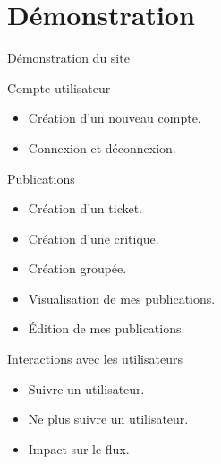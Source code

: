 \section{Démonstration}

\begin{frame}{Démonstration du site}
  \begin{block}{Compte utilisateur}
    \tiny
    \begin{itemize}
    \item Création d'un nouveau compte.
    \item Connexion et déconnexion.
    \end{itemize}
  \end{block}

  \begin{block}{Publications}
    \tiny
    \begin{itemize}
    \item Création d'un ticket.
    \item Création d'une critique.
    \item Création groupée.
    \item Visualisation de mes publications.
    \item Édition de mes publications.
    \end{itemize}
  \end{block}

  \begin{block}{Interactions avec les utilisateurs}
    \tiny
    \begin{itemize}
    \item Suivre un utilisateur.
    \item Ne plus suivre un utilisateur.
    \item Impact sur le flux.
    \end{itemize}
  \end{block}
\end{frame}
